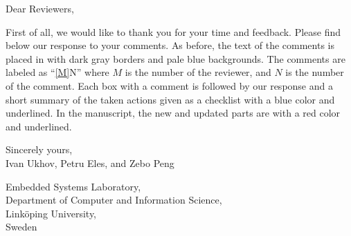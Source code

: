 Dear Reviewers,

\vspace{2em}
\noindent First of all, we would like to thank you for your time and feedback.
Please find below our response to your comments. As before, the text of the
comments is placed in  with dark gray borders and pale blue
backgrounds. The comments are labeled as ``\cref{M}{N}'' where $M$ is the number
of the reviewer, and $N$ is the number of the comment. Each box with a comment
is followed by our response and a short summary of the taken actions given as a
checklist  with a blue color and underlined. In the
manuscript, the new and updated parts are  with a red color and
underlined.

\vspace{2em}
\noindent Sincerely yours,\\
Ivan Ukhov, Petru Eles, and Zebo Peng

\vspace{1em}
\noindent Embedded Systems Laboratory,\\
Department of Computer and Information Science,\\
Link\"{o}ping University,\\
Sweden

$ $
